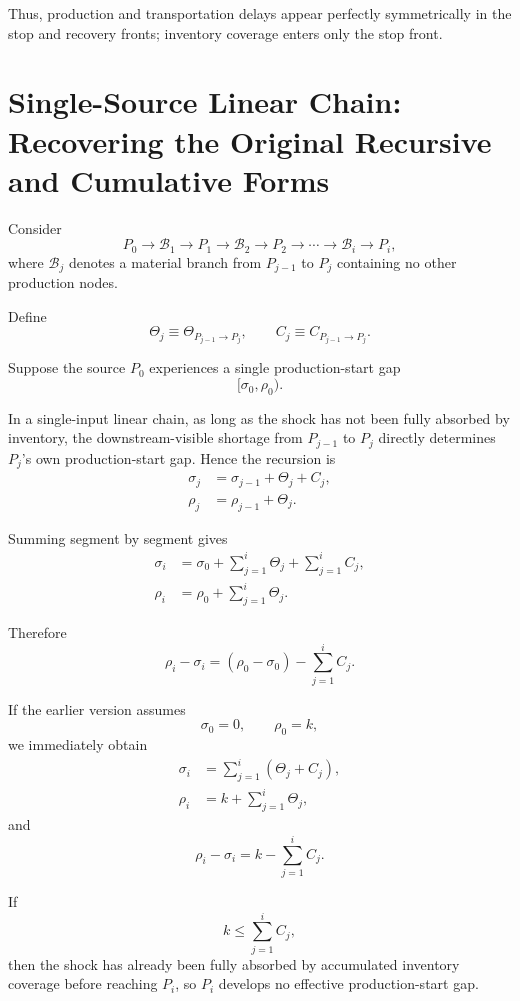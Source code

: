\documentclass[11pt]{article}
\begin{document}
Thus, production and transportation delays
appear perfectly symmetrically in the stop and recovery fronts;
inventory coverage enters only the stop front.

\section{Single-Source Linear Chain: Recovering the Original Recursive and Cumulative Forms}

Consider
\[
P_0
\rightarrow\mathcal B_1
\rightarrow P_1
\rightarrow\mathcal B_2
\rightarrow P_2
\rightarrow\cdots
\rightarrow\mathcal B_i
\rightarrow P_i,
\]
where \(\mathcal B_j\) denotes
a material branch from \(P_{j-1}\) to \(P_j\) containing no other production nodes.

Define
\[
\Theta_j
\equiv
\Theta_{P_{j-1}\to P_j},
\qquad
C_j
\equiv
C_{P_{j-1}\to P_j}.
\]

Suppose the source \(P_0\) experiences a single production-start gap
\[
[\sigma_0,\rho_0).
\]

In a single-input linear chain, as long as the shock has not been fully absorbed by inventory,
the downstream-visible shortage from \(P_{j-1}\) to \(P_j\)
directly determines \(P_j\)'s own production-start gap.
Hence the recursion is
\[
\boxed{
\begin{aligned}
\sigma_j
&=
\sigma_{j-1}
+\Theta_j
+C_j,
\\[1mm]
\rho_j
&=
\rho_{j-1}
+\Theta_j.
\end{aligned}
}
\tag{13}
\]

Summing segment by segment gives
\[
\boxed{
\begin{aligned}
\sigma_i
&=
\sigma_0
+\sum_{j=1}^{i}\Theta_j
+\sum_{j=1}^{i}C_j,
\\[1mm]
\rho_i
&=
\rho_0
+\sum_{j=1}^{i}\Theta_j.
\end{aligned}
}
\tag{14}
\]

Therefore
\[
\boxed{
\rho_i-\sigma_i
=
(\rho_0-\sigma_0)
-
\sum_{j=1}^{i}C_j.
}
\tag{15}
\]

If the earlier version assumes
\[
\sigma_0=0,
\qquad
\rho_0=k,
\]
we immediately obtain
\[
\boxed{
\begin{aligned}
\sigma_i
&=
\sum_{j=1}^{i}(\Theta_j+C_j),
\\[1mm]
\rho_i
&=
k+\sum_{j=1}^{i}\Theta_j,
\end{aligned}
}
\tag{16}
\]
and
\[
\boxed{
\rho_i-\sigma_i
=
k-\sum_{j=1}^{i}C_j.
}
\tag{17}
\]

If
\[
k\le \sum_{j=1}^{i}C_j,
\]
then the shock has already been fully absorbed by accumulated inventory coverage before reaching \(P_i\),
so \(P_i\) develops no effective production-start gap.
\end{document}
